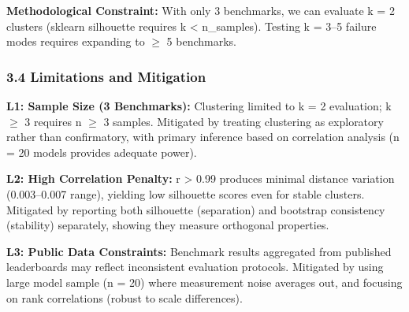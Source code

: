 \textbf{Methodological Constraint:} With only 3 benchmarks, we can evaluate k = 2 clusters (sklearn silhouette requires k < n\_samples). Testing k = 3--5 failure modes requires expanding to $\geq$ 5 benchmarks.

\subsubsection{3.4 Limitations and Mitigation}

\textbf{L1: Sample Size (3 Benchmarks):} Clustering limited to k = 2 evaluation; k $\geq$ 3 requires n $\geq$ 3 samples. Mitigated by treating clustering as exploratory rather than confirmatory, with primary inference based on correlation analysis (n = 20 models provides adequate power).

\textbf{L2: High Correlation Penalty:} r > 0.99 produces minimal distance variation (0.003--0.007 range), yielding low silhouette scores even for stable clusters. Mitigated by reporting both silhouette (separation) and bootstrap consistency (stability) separately, showing they measure orthogonal properties.

\textbf{L3: Public Data Constraints:} Benchmark results aggregated from published leaderboards may reflect inconsistent evaluation protocols. Mitigated by using large model sample (n = 20) where measurement noise averages out, and focusing on rank correlations (robust to scale differences).
